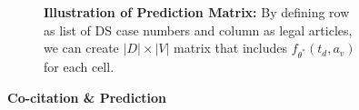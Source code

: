 \begin{figure}[!tbp]
\begin{subfigure}[b]{0.49\textwidth}
\begin{tikzpicture}
        \end{tikzpicture} 
        \label{fig:illutrate-preds}      
        \caption{\textbf{Illustration of Prediction Matrix:} By defining row as list of DS case numbers and column as legal articles, we can create $|D| \times |V|$ matrix that includes $f_{\theta^*}(t_d, a_v)$ for each cell.}    
    \end{subfigure}
    \hfill
    \begin{subfigure}[b]{0.49\textwidth}
    \end{subfigure}
    \caption{{\bf Co-citation \& Prediction}}
    \label{fig:illutrate-preds}
  \end{figure}
  